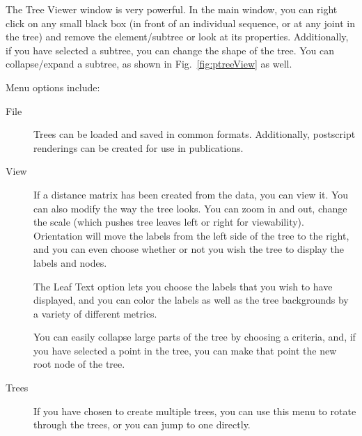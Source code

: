 The Tree Viewer window is very powerful.  In the main window, you can
right click on any small black box (in front of an individual sequence,
or at any joint in the tree) and remove the element/subtree or look at
its properties.  Additionally, if you have selected a subtree, you can
change the shape of the tree.  You can collapse/expand a subtree, as
shown in Fig.~\ref{fig:ptreeView} as well.

Menu options include:

\begin{description}
\item[File]  Trees can be loaded and saved in common formats.
Additionally, postscript renderings can be created for use in
publications.
\item[View] If a distance matrix has been created from the data, you can
view it.  You can also modify the way the tree looks.  You can zoom in
and out, change the scale (which pushes tree leaves left or right for
viewability).  Orientation will move the labels from the left side of
the tree to the right, and you can even choose whether or not you wish
the tree to display the labels and nodes.

The \textsf{Leaf Text} option lets you choose the labels that you wish
to have displayed, and you can color the labels as well as the tree
backgrounds by a variety of different metrics. 

You can easily collapse large parts of the tree by choosing a criteria,
and, if you have selected a point in the tree, you can make that point
the new root node of the tree.

\item[Trees] If you have chosen to create multiple trees, you can use
this menu to rotate through the trees, or you can jump to one directly.

\end{description}

